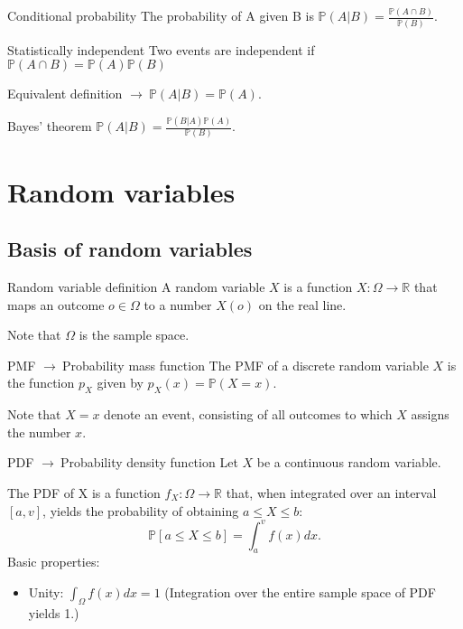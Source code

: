 \documentclass[11pt,a4paper,fleqn]{article}
\numberwithin{equation}{section}
\newcommand{\prob}{\mathbb{P}}
\newcommand{\samplespace}{\Omega}
\newcommand{\g}{$\rightarrow\ $}
\begin{document}
\begin{fact}{Conditional probability}{}
    The probability of A given B is $\prob(A|B) = \frac{\prob(A\cap B)}{\prob(B)}$.
\end{fact}

\begin{fact}{Statistically independent}{}
    Two events are independent if $\prob(A\cap B) = \prob(A)\prob(B)$
\end{fact}

Equivalent definition \g $\prob(A|B) = \prob(A)$.

\begin{fact}{Bayes’ theorem}{}
    $\prob(A|B) = \frac{\prob (B|A)\prob(A)}{\prob(B)}$.
\end{fact}

\section{Random variables}

\subsection{Basis of random variables}

\begin{fact}{Random variable definition}{}
    A random variable $X$ is a function $X:\samplespace\rightarrow\mathbb{R}$ that maps an outcome $o\in\samplespace$ to a number $X(o)$ on the real line.

    Note that $\Omega$ is the sample space.
\end{fact}

\begin{fact}{PMF \g Probability mass function}{}
    The PMF of a discrete random variable $X$ is the function $p_X$ given by $p_X(x) = \mathbb{P}(X=x)$.

    Note that $X=x$ denote an event, consisting of all outcomes to which $X$ assigns the number $x$.
\end{fact}

\begin{fact}{PDF \g Probability density function}{}
    Let $X$ be a continuous random variable.

    The PDF of X is a function $f_X\mathbin{:}\Omega\rightarrow\mathbb{R}$ that, when integrated
    over an interval $[a,v]$, yields the probability of obtaining $a\le X \le b$:
    \begin{equation*}
        \mathbb{P}[a\le X \le b] = \int_{a}^{v}f(x)dx.
    \end{equation*}
    Basic properties:
    \begin{itemize}
        \item Unity: $\int_\samplespace f(x)dx=1$ (Integration over the entire sample space of PDF yields 1.)
    \end{itemize}
\end{fact}
\end{document}
